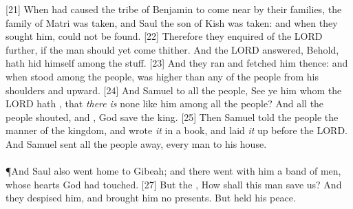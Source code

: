 [21] \textcolor[cmyk]{0.99998,1,0,0}{When  had caused the tribe of Benjamin to come near by their families, the family of Matri was taken, and Saul the son of Kish was taken: and when they sought him,  could not be found.}
[22] \textcolor[cmyk]{0.99998,1,0,0}{Therefore they enquired of the LORD further, if the man should yet come thither. And the LORD answered, Behold,  hath hid himself among the stuff.}
[23] \textcolor[cmyk]{0.99998,1,0,0}{And they ran and fetched him thence: and when  stood among the people,  was higher than any of the people from his shoulders and upward.}
[24] \textcolor[cmyk]{0.99998,1,0,0}{And Samuel  to all the people, See ye him whom the LORD hath , that \emph{there} \emph{is} none like him among all the people? And all the people shouted, and , God save the king.}
[25] \textcolor[cmyk]{0.99998,1,0,0}{Then Samuel told the people the manner of the kingdom, and wrote \emph{it} in a book, and laid \emph{it} up before the LORD. And Samuel sent all the people away, every man to his house.}\\
\\
\P \textcolor[cmyk]{0.99998,1,0,0}{And Saul also went home to Gibeah; and there went with him a band of men, whose hearts God had touched.}
[27] \textcolor[cmyk]{0.99998,1,0,0}{But the  , How shall this man save us? And they despised him, and brought him no presents. But  held his peace.}